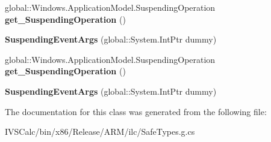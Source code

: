 \begin{DoxyCompactItemize}
global\+::\+Windows.\+Application\+Model.\+Suspending\+Operation {\bfseries get\+\_\+\+Suspending\+Operation} ()
\item 
\mbox{\label{class_windows_1_1_application_model_1_1_suspending_event_args_a83997edaf208cdd4378feed7abefd6a8}} 
{\bfseries Suspending\+Event\+Args} (global\+::\+System.\+Int\+Ptr dummy)
\item 
\mbox{\label{class_windows_1_1_application_model_1_1_suspending_event_args_a7f49ba2ed2c19d266f84bb9acb748f17}} 
global\+::\+Windows.\+Application\+Model.\+Suspending\+Operation {\bfseries get\+\_\+\+Suspending\+Operation} ()
\item 
\mbox{\label{class_windows_1_1_application_model_1_1_suspending_event_args_a83997edaf208cdd4378feed7abefd6a8}} 
{\bfseries Suspending\+Event\+Args} (global\+::\+System.\+Int\+Ptr dummy)
\end{DoxyCompactItemize}


The documentation for this class was generated from the following file\+:\begin{DoxyCompactItemize}
\item 
I\+V\+S\+Calc/bin/x86/\+Release/\+A\+R\+M/ilc/Safe\+Types.\+g.\+cs\end{DoxyCompactItemize}
